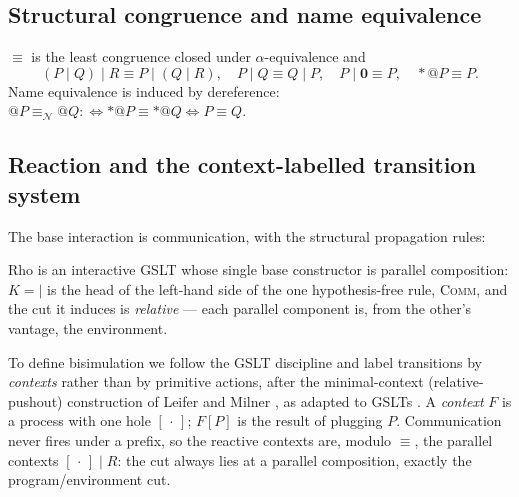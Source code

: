 \documentclass[11pt]{article}
\makeatletter
\newcommand{\Zero}{\mathbf{0}}
\newcommand{\Par}{\mathbin{\mid}}
\newcommand{\inp}[3]{\mathsf{for}(#1 \leftarrow #2)\,#3}
\newcommand{\out}[2]{#1\mathbin{!}(#2)}
\newcommand{\drp}[1]{{\ast}#1}
\newcommand{\quo}[1]{@#1}
\newcommand{\scong}{\equiv}
\newcommand{\nameq}{\equiv_{\mathcal N}}
\newcommand{\hole}{[\,\cdot\,]}                %
\newcommand{\plug}[2]{#1[#2]}                  %
\theoremstyle{plain}
\theoremstyle{definition}
\makeatother
\begin{document}
\subsection{Structural congruence and name equivalence}
$\scong$ is the least congruence closed under $\alpha$-equivalence and
\[
  (P\Par Q)\Par R \scong P\Par(Q\Par R),\quad
  P\Par Q \scong Q\Par P,\quad
  P\Par\Zero \scong P,\quad
  \drp{\quo P}\scong P .
\]
Name equivalence is induced by dereference:
$\quo P \nameq \quo Q :\Longleftrightarrow \drp{\quo P}\scong\drp{\quo Q}
 \Longleftrightarrow P\scong Q$.

\subsection{Reaction and the context-labelled transition system}\label{sec:lts}
The base interaction is communication, with the structural propagation rules:
Rho is an interactive GSLT whose single base constructor is parallel composition:
$K=\Par$ is the head of the left-hand side of the one hypothesis-free rule,
\textsc{Comm}, and the cut it induces is \emph{relative} --- each parallel
component is, from the other's vantage, the environment.

To define bisimulation we follow the GSLT discipline and label transitions by
\emph{contexts} rather than by primitive actions, after the minimal-context
(relative-pushout) construction of Leifer and Milner \cite{leifermilner,sewell}, as
adapted to GSLTs \cite{meredithwells}. A \emph{context} $F$ is a process with one
hole $\hole$; $\plug F P$ is the result of plugging $P$. Communication never fires
under a prefix, so the reactive contexts are, modulo $\scong$, the parallel
contexts $\hole\Par R$: the cut always lies at a parallel composition, exactly the
program/environment cut.
\end{document}
